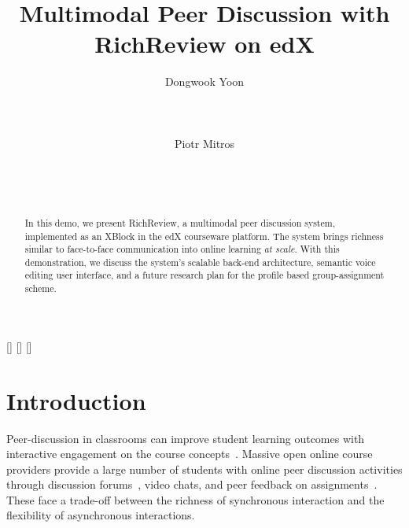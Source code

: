 \documentclass{sigchi}
\begin{document}
\title{Multimodal Peer Discussion with RichReview on edX}

\author{
  \alignauthor Dongwook Yoon\\
    \\
    \\
    \\
  \alignauthor Piotr Mitros\\
    \\
    \\
    \\
}

\maketitle

\begin{abstract}
In this demo, we present RichReview, a multimodal peer discussion system, implemented as an XBlock in the edX courseware platform. The system brings richness similar to face-to-face communication into online learning \emph{at scale}. With this demonstration, we discuss the system's scalable back-end architecture, semantic voice editing user interface, and a future research plan for the profile based group-assignment scheme.
\end{abstract}


[] 
[] 
[] 

\section{Introduction}

Peer-discussion in classrooms can improve student learning outcomes with interactive engagement on the course concepts~\cite{chi2014icap}.
Massive open online course providers provide a large number of students with online peer discussion activities through discussion forums~\cite{13Mitros6002}, video chats, and peer feedback on assignments~\cite{linc}. These face a trade-off between the richness of synchronous interaction and the flexibility of asynchronous interactions.
\end{document}
